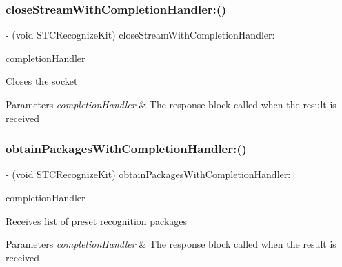 \subsubsection{\texorpdfstring{close\+Stream\+With\+Completion\+Handler\+:()}{closeStreamWithCompletionHandler:()}}
{\footnotesize\ttfamily -\/ (void S\+T\+C\+Recognize\+Kit) close\+Stream\+With\+Completion\+Handler\+: \begin{DoxyParamCaption}\item[{(Recognize\+Completion\+Handler)}]{completion\+Handler }\end{DoxyParamCaption}}

Closes the socket 
\begin{DoxyParams}{Parameters}
{\em completion\+Handler} & The response block called when the result is received \\
\hline
\end{DoxyParams}
\hypertarget{protocol_s_t_c_recognize_kit_01-p_a045faae471fb24ae41f0b40d24d41914}{}\label{protocol_s_t_c_recognize_kit_01-p_a045faae471fb24ae41f0b40d24d41914} 
\subsubsection{\texorpdfstring{obtain\+Packages\+With\+Completion\+Handler\+:()}{obtainPackagesWithCompletionHandler:()}}
{\footnotesize\ttfamily -\/ (void S\+T\+C\+Recognize\+Kit) obtain\+Packages\+With\+Completion\+Handler\+: \begin{DoxyParamCaption}\item[{(Packages\+Completion\+Handler)}]{completion\+Handler }\end{DoxyParamCaption}}

Receives list of preset recognition packages 
\begin{DoxyParams}{Parameters}
{\em completion\+Handler} & The response block called when the result is received \\
\hline
\end{DoxyParams}
\hypertarget{protocol_s_t_c_recognize_kit_01-p_a6b2b5a9ecc1f659c4d7633d113f00d8a}{}\label{protocol_s_t_c_recognize_kit_01-p_a6b2b5a9ecc1f659c4d7633d113f00d8a} 
